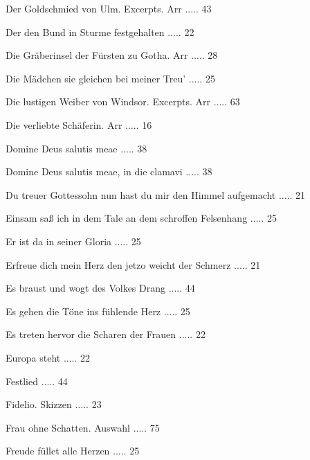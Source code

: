 \documentclass[a4paper, twocolumn, 11pt]{book}
\begin{document}
\newline 
Der Goldschmied von Ulm. Excerpts. Arr ..... 43

\newline 
Der den Bund in Sturme festgehalten ..... 22

\newline 
Die Gräberinsel der Fürsten zu Gotha. Arr ..... 28

\newline 
Die Mädchen sie gleichen bei meiner Treu' ..... 25

\newline 
Die lustigen Weiber von Windsor. Excerpts. Arr ..... 63

\newline 
Die verliebte Schäferin. Arr ..... 16

\newline 
Domine Deus salutis meae ..... 38

\newline 
Domine Deus salutis meae, in die clamavi ..... 38

\newline 
Du treuer Gottessohn nun hast du mir den Himmel aufgemacht ..... 21

\newline 
Einsam saß ich in dem Tale an dem schroffen Felsenhang ..... 25

\newline 
Er ist da in seiner Gloria ..... 25

\newline 
Erfreue dich mein Herz den jetzo weicht der Schmerz ..... 21

\newline 
Es braust und wogt des Volkes Drang ..... 44

\newline 
Es gehen die Töne ins fühlende Herz ..... 25

\newline 
Es treten hervor die Scharen der Frauen ..... 22

\newline 
Europa steht ..... 22

\newline 
Festlied ..... 44

\newline 
Fidelio. Skizzen ..... 23

\newline 
Frau ohne Schatten. Auswahl ..... 75

\newline 
Freude füllet alle Herzen ..... 25
\end{document}
